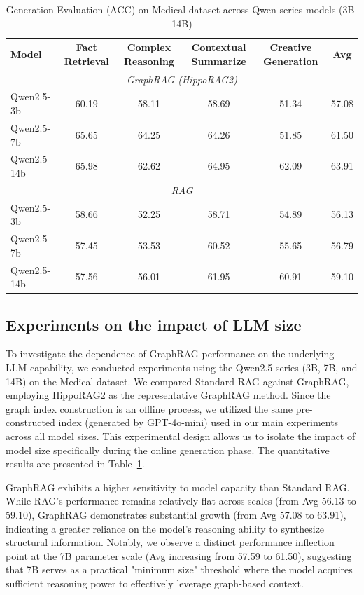 \documentclass{article} %
\begin{document}
\begin{table}[ht]
\centering
\scriptsize
\caption{Generation Evaluation (ACC) on Medical dataset across Qwen series models (3B-14B)}
\label{tab:llm_size_comparison}
\setlength{\tabcolsep}{6pt}

\begin{tabular}{lccccc}
\toprule
Model & Fact Retrieval & Complex Reasoning & Contextual Summarize & Creative Generation & Avg \\
\midrule

\multicolumn{6}{c}{\cellcolor[HTML]{EFEFEF}\textit{GraphRAG (HippoRAG2)}} \\
Qwen2.5-3b  & 60.19 & 58.11 & 58.69 & 51.34 & 57.08 \\
Qwen2.5-7b  & 65.65 & 64.25 & 64.26 & 51.85 & 61.50 \\
Qwen2.5-14b & 65.98 & 62.62 & 64.95 & 62.09 & 63.91 \\[3pt]

\multicolumn{6}{c}{\cellcolor[HTML]{EFEFEF}\textit{RAG}} \\
Qwen2.5-3b  & 58.66 & 52.25 & 58.71 & 54.89 & 56.13 \\
Qwen2.5-7b  & 57.45 & 53.53 & 60.52 & 55.65 & 56.79 \\
Qwen2.5-14b & 57.56 & 56.01 & 61.95 & 60.91 & 59.10 \\
\bottomrule
\end{tabular}

\end{table}


\subsection{Experiments on the impact of LLM size}
To investigate the dependence of GraphRAG performance on the underlying LLM capability, we conducted experiments using the Qwen2.5 series (3B, 7B, and 14B) on the Medical dataset. We compared Standard RAG against GraphRAG, employing HippoRAG2 as the representative GraphRAG method. Since the graph index construction is an offline process, we utilized the same pre-constructed index (generated by GPT-4o-mini) used in our main experiments across all model sizes. This experimental design allows us to isolate the impact of model size specifically during the online generation phase. The quantitative results are presented in Table~\ref{tab:llm_size_comparison}.

GraphRAG exhibits a higher sensitivity to model capacity than Standard RAG. While RAG's performance remains relatively flat across scales (from Avg 56.13 to 59.10), GraphRAG demonstrates substantial growth (from Avg 57.08 to 63.91), indicating a greater reliance on the model's reasoning ability to synthesize structural information. Notably, we observe a distinct performance inflection point at the 7B parameter scale (Avg increasing from 57.59 to 61.50), suggesting that 7B serves as a practical "minimum size" threshold where the model acquires sufficient reasoning power to effectively leverage graph-based context.
\end{document}
